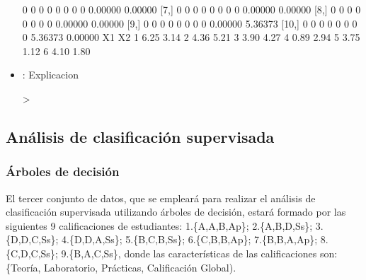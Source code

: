 \documentclass[a4paper, 12pt]{article}
\begin{document}
\begin{itemize}
\begin{Schunk}
\begin{Soutput}
 [6,]    0    0    0    0    0    0    0    0 0.00000 0.00000
 [7,]    0    0    0    0    0    0    0    0 0.00000 0.00000
 [8,]    0    0    0    0    0    0    0    0 0.00000 0.00000
 [9,]    0    0    0    0    0    0    0    0 0.00000 5.36373
[10,]    0    0    0    0    0    0    0    0 5.36373 0.00000
    X1   X2
1 6.25 3.14
2 4.36 5.21
3 3.90 4.27
4 0.89 2.94
5 3.75 1.12
6 4.10 1.80
\end{Soutput}
\end{Schunk}
		\item \texttt{}: 
		Explicacion
\begin{Schunk}
\begin{Sinput}
> 
\end{Sinput}
\end{Schunk}

	\end{itemize}
		
	\newpage

	\subsection{Análisis de clasificación supervisada}
	
	\subsubsection{Árboles de decisión}
	
	El tercer conjunto de datos, que se empleará para realizar el análisis de clasificación supervisada utilizando árboles de decisión, estará formado por las siguientes 9 calificaciones de estudiantes: 1.\{A,A,B,Ap\}; 2.\{A,B,D,Ss\}; 3.\{D,D,C,Ss\}; 4.\{D,D,A,Ss\}; 5.\{B,C,B,Ss\}; 6.\{C,B,B,Ap\}; 7.\{B,B,A,Ap\}; 8.\{C,D,C,Ss\}; 9.\{B,A,C,Ss\}, donde las características de las calificaciones son: \{Teoría, Laboratorio, Prácticas, Calificación Global).
\end{document}

